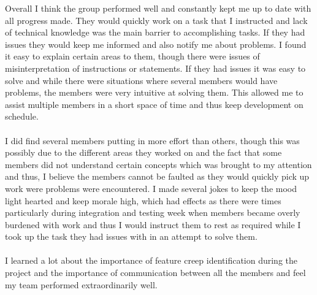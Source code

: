 \documentclass[12pt]{article}
\begin{document}
Overall I think the group performed well and constantly kept me up to date with all progress made. They would quickly work on a task that I instructed and lack of technical knowledge was the main barrier to accomplishing tasks. If they had issues they would keep me informed and also notify me about problems. I found it easy to explain certain areas to them, though there were issues of misinterpretation of instructions or statements. If they had issues it was easy to solve and while there were situations where several members would have problems, the members were very intuitive at solving them. This allowed me to assist multiple members in a short space of time and thus keep development on schedule.~\\\\
I did find several members putting in more effort than others, though this was possibly due to the different areas they worked on and the fact that some members did not understand certain concepts which was brought to my attention and thus, I believe the members cannot be faulted as they would quickly pick up work were problems were encountered. I made several jokes to keep the mood light hearted and keep morale high, which had effects as there were times particularly during integration and testing week when members became overly burdened with work and thus I would instruct them to rest as required while I took up the task they had issues with in an attempt to solve them.~\\\\
I learned a lot about the importance of feature creep identification during the project and the importance of communication between all the members and feel my team performed extraordinarily well.
\end{document}
